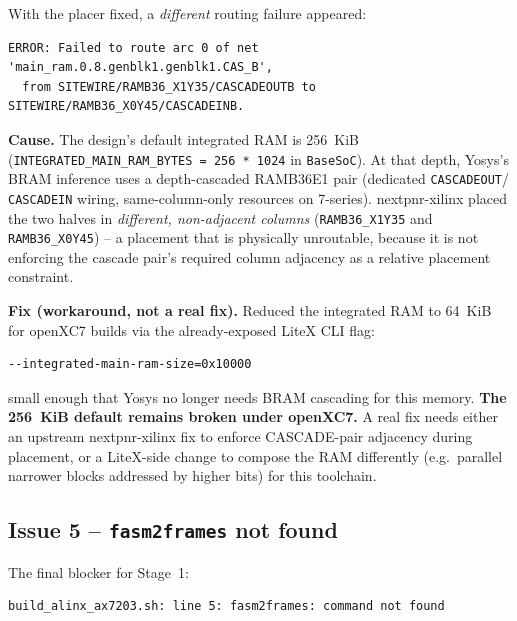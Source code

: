 \documentclass[11pt]{article}
\begin{document}
With the placer fixed, a \emph{different} routing failure appeared:
\begin{lstlisting}[style=termout]
ERROR: Failed to route arc 0 of net 'main_ram.0.8.genblk1.genblk1.CAS_B',
  from SITEWIRE/RAMB36_X1Y35/CASCADEOUTB to SITEWIRE/RAMB36_X0Y45/CASCADEINB.
\end{lstlisting}

\textbf{Cause.} The design's default integrated RAM is 256~KiB
(\lstinline{INTEGRATED_MAIN_RAM_BYTES = 256 * 1024} in
\lstinline{BaseSoC}). At that depth, Yosys's BRAM inference uses a
depth-cascaded RAMB36E1 pair (dedicated \lstinline{CASCADEOUT}/
\lstinline{CASCADEIN} wiring, same-column-only resources on 7-series).
nextpnr-xilinx placed the two halves in \emph{different, non-adjacent
columns} (\lstinline{RAMB36_X1Y35} and \lstinline{RAMB36_X0Y45}) -- a
placement that is physically unroutable, because it is not enforcing the
cascade pair's required column adjacency as a relative placement
constraint.

\textbf{Fix (workaround, not a real fix).} Reduced the integrated RAM to
64~KiB for openXC7 builds via the already-exposed LiteX CLI flag:
\begin{lstlisting}[style=termout]
--integrated-main-ram-size=0x10000
\end{lstlisting}
small enough that Yosys no longer needs BRAM cascading for this memory.
\textbf{The 256~KiB default remains broken under openXC7.} A real fix
needs either an upstream nextpnr-xilinx fix to enforce CASCADE-pair
adjacency during placement, or a LiteX-side change to compose the RAM
differently (e.g.\ parallel narrower blocks addressed by higher bits)
for this toolchain.

\subsection{Issue 5 -- \texttt{fasm2frames} not found}

The final blocker for Stage~1:
\begin{lstlisting}[style=termout]
build_alinx_ax7203.sh: line 5: fasm2frames: command not found
\end{lstlisting}
\end{document}
